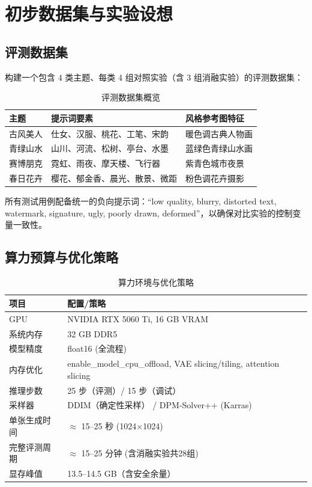 \documentclass[10pt,a4paper]{article}
\begin{document}
\section{初步数据集与实验设想}

\subsection{评测数据集}

构建一个包含 4 类主题、每类 4 组对照实验（含 3 组消融实验）的评测数据集：

\begin{table}[H]
\centering
\caption{评测数据集概览}
\label{tab:dataset}
\begin{tabular}{@{}p{2cm}p{5.2cm}p{3.5cm}@{}}
\toprule
\textbf{主题} & \textbf{提示词要素} & \textbf{风格参考图特征} \\
\midrule
古风美人   & 仕女、汉服、桃花、工笔、宋韵     & 暖色调古典人物画 \\
青绿山水   & 山川、河流、松树、亭台、水墨     & 蓝绿色青绿山水画 \\
赛博朋克   & 霓虹、雨夜、摩天楼、飞行器       & 紫青色城市夜景 \\
春日花卉   & 樱花、郁金香、晨光、散景、微距   & 粉色调花卉摄影 \\
\bottomrule
\end{tabular}
\end{table}

所有测试用例配备统一的负向提示词：``low quality, blurry, distorted text, watermark, signature, ugly, poorly drawn, deformed''，以确保对比实验的控制变量一致性。

\subsection{算力预算与优化策略}

\begin{table}[H]
\centering
\caption{算力环境与优化策略}
\label{tab:compute}
\begin{tabular}{@{}ll@{}}
\toprule
\textbf{项目} & \textbf{配置/策略} \\
\midrule
GPU         & NVIDIA RTX 5060 Ti, 16 GB VRAM \\
系统内存    & 32 GB DDR5 \\
模型精度    & float16 (全流程) \\
内存优化    & enable\_model\_cpu\_offload, VAE slicing/tiling, attention slicing \\
推理步数    & 25 步（评测）/ 15 步（调试） \\
采样器      & DDIM（确定性采样） / DPM-Solver++ (Karras) \\
单张生成时间 & $\approx$ 15--25 秒 (1024×1024) \\
完整评测周期 & $\approx$ 15--25 分钟 (含消融实验共28组) \\
显存峰值    & 13.5--14.5 GB（含安全余量） \\
\bottomrule
\end{tabular}
\end{table}
\end{document}
